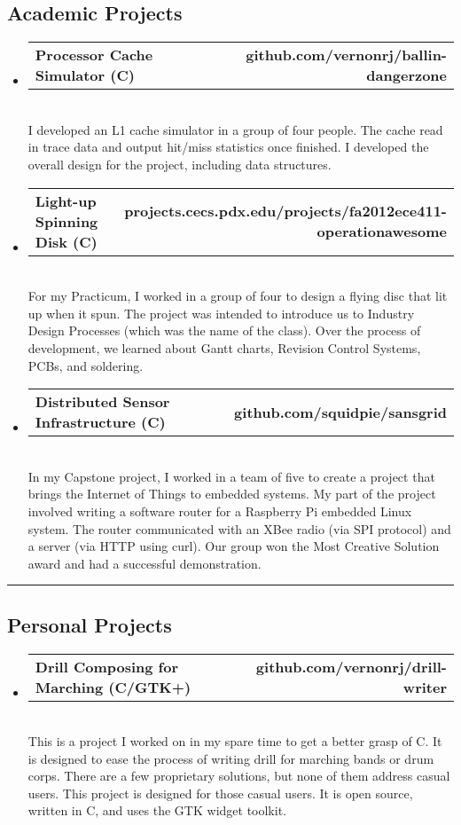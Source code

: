 \documentclass[10pt,letterpaper]{article}
\makeatletter
\newcommand{\headerrow}[2]
{\begin{tabular*}{\linewidth}{l@{\extracolsep{\fill}}r}
	#1 &
	#2 \\
\end{tabular*}}
\newcommand{\CPP}
{C\nolinebreak[4]\hspace{-.05em}\raisebox{.22ex}{\footnotesize\bf ++}}
\makeatother
\begin{document}
\subsection*{Academic Projects}
\begin{itemize}
  \item 
  \headerrow 
  {\textbf{Processor Cache Simulator (\CPP)}}
  {\textbf{github.com/vernonrj/ballin-dangerzone}}
  \\
  I developed an L1 cache simulator in a group of four people. The cache read in trace data and output hit/miss statistics once finished. I developed the overall design for the project, including data structures.
  \item 
  \headerrow 
  {\textbf{Light-up Spinning Disk (C)}}
  {\textbf{projects.cecs.pdx.edu/projects/fa2012ece411-operationawesome}}
  \\
  For my Practicum, I worked in a group of four to design a flying disc that lit up when it spun. The project was intended to introduce us to Industry Design Processes (which was the name of the class). Over the process of development, we learned about Gantt charts, Revision Control Systems, PCBs, and soldering.
  \item
  \headerrow
  {\textbf{Distributed Sensor Infrastructure (C)}}
  {\textbf{github.com/squidpie/sansgrid}}
  \\
  In my Capstone project, I worked in a team of five to create a project that brings the Internet of Things to embedded systems. My part of the project involved writing a software router for a Raspberry Pi embedded Linux system. The router communicated with an XBee radio (via SPI protocol) and a server (via HTTP using curl). Our group won the Most Creative Solution award and had a successful demonstration.
\end{itemize}

\hrule
\vspace{-0.4em}
\subsection*{Personal Projects}
\begin{itemize}
  \item
  \headerrow
  {\textbf{Drill Composing for Marching (C/GTK+)}}
  {\textbf{github.com/vernonrj/drill-writer}}
  \\
  This is a project I worked on in my spare time to get a better grasp of C. It is designed to ease the process of writing drill for marching bands or drum corps. There are a few proprietary solutions, but none of them address casual users. This project is designed for those casual users. It is open source, written in C, and uses the GTK widget toolkit.
\end{itemize}
\end{document}
